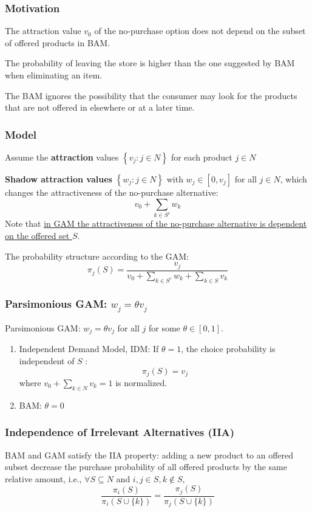 \documentclass[11pt,a4paper]{article}
\begin{document}
\subsubsection{Motivation}
The attraction value $v_0$ of the no-purchase option does not depend on the subset of offered products in BAM.

The probability of leaving the store is higher than the one suggested by BAM when eliminating an item.

The BAM ignores the possibility that the consumer may look for the products that are not offered in elsewhere or at a later time.

\subsubsection{Model}
Assume the \textbf{attraction} values $\left\{v_{j}: j \in N\right\}$ for each product $j \in N$

\textbf{Shadow attraction values} $\left\{w_{j}: j \in N\right\}$ with $w_{j} \in\left[0, v_{j}\right]$ for all $j \in N$, which changes the attractiveness of the no-purchase alternative:
$$
v_{0}+\sum_{k \in S^{c}} w_{k}
$$
Note that \underline{in GAM the attractiveness of the no-purchase alternative is dependent on the offered set $S$}.

The probability structure according to the GAM:
$$
\pi_{j}(S)=\frac{v_{j}}{v_{0}+\sum_{k \in S^{c}} w_{k}+\sum_{k \in S} v_{k}}
$$

\subsubsection{Parsimonious GAM: $w_{j}=\theta v_{j}$}
Parsimonious GAM: $w_{j}=\theta v_{j}$ for all $j$ for some $\theta \in[0,1]$.
\begin{enumerate}[$\bullet$]
    \item Independent Demand Model, IDM: If $\theta=1$, the choice probability is independent of $S$ :
    $$
    \pi_{j}(S)=v_{j}
    $$
    where $v_0+\sum_{k\in N}v_k=1$ is normalized.
    \item BAM: $\theta=0$
\end{enumerate}

\subsubsection{Independence of Irrelevant Alternatives (IIA)}
BAM and GAM satisfy the IIA property: adding a new product to an offered subset decrease the purchase probability of all offered products by the same relative amount, i.e., $\forall S\subseteq N$ and $i,j\in S,k\notin S$,
$$\frac{\pi_i(S)}{\pi_i(S\cup\{k\})}=\frac{\pi_j(S)}{\pi_j(S\cup\{k\})}$$
\end{document}
